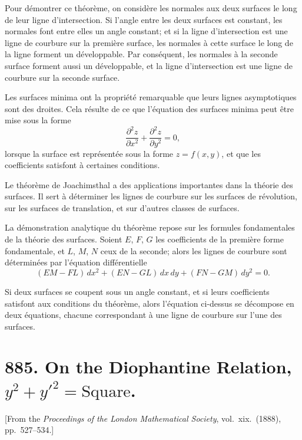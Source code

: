 \documentclass[12pt,a4paper]{article}
\theoremstyle{plain}
\begin{document}
\medskip\noindent
Pour d\'emontrer ce th\'eor\`eme, on consid\`ere les normales aux deux surfaces le long de leur ligne d'intersection. Si l'angle entre les deux surfaces est constant, les normales font entre elles un angle constant; et si la ligne d'intersection est une ligne de courbure sur la premi\`ere surface, les normales \`a cette surface le long de la ligne forment un d\'eveloppable. Par cons\'equent, les normales \`a la seconde surface forment aussi un d\'eveloppable, et la ligne d'intersection est une ligne de courbure sur la seconde surface.

\medskip\noindent
Les surfaces minima ont la propri\'et\'e remarquable que leurs lignes asymptotiques sont des droites. Cela r\'esulte de ce que l'\'equation des surfaces minima peut \^etre mise sous la forme
\[
\frac{\partial^{2}z}{\partial x^{2}} + \frac{\partial^{2}z}{\partial y^{2}} = 0,
\]
lorsque la surface est repr\'esent\'ee sous la forme $z = f(x,y)$, et que les coefficients satisfont \`a certaines conditions.

\medskip\noindent
Le th\'eor\`eme de Joachimsthal a des applications importantes dans la th\'eorie des surfaces. Il sert \`a d\'eterminer les lignes de courbure sur les surfaces de r\'evolution, sur les surfaces de translation, et sur d'autres classes de surfaces.

\medskip\noindent
La d\'emonstration analytique du th\'eor\`eme repose sur les formules fondamentales de la th\'eorie des surfaces. Soient $E$, $F$, $G$ les coefficients de la premi\`ere forme fondamentale, et $L$, $M$, $N$ ceux de la seconde; alors les lignes de courbure sont d\'etermin\'ees par l'\'equation diff\'erentielle
\[
(EM - FL)\,dx^{2} + (EN - GL)\,dx\,dy + (FN - GM)\,dy^{2} = 0.
\]

Si deux surfaces se coupent sous un angle constant, et si leurs coefficients satisfont aux conditions du th\'eor\`eme, alors l'\'equation ci-dessus se d\'ecompose en deux \'equations, chacune correspondant \`a une ligne de courbure sur l'une des surfaces.

\newpage
\section[885]{885. On the Diophantine Relation, $y^{2} + y'^{2} = \text{Square}$.}
\label{sec:885}

[From the \textit{Proceedings of the London Mathematical Society}, vol.\ xix.\ (1888), pp.\ 527--534.]
\end{document}
